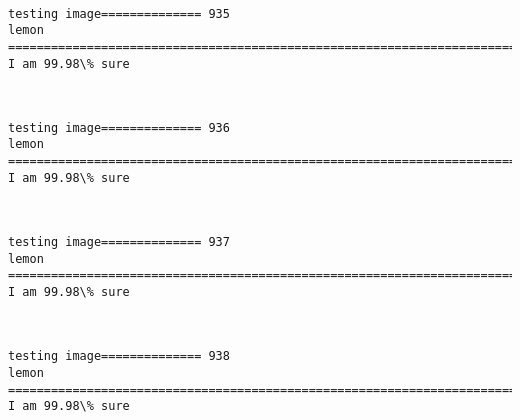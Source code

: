 \documentclass[11pt]{article}
\begin{document}
    \begin{center}
    \end{center}
    { \hspace*{\fill} \\}
    
    \begin{Verbatim}[commandchars=\\\{\}]
testing image============== 935
lemon
============================================================================
I am 99.98\% sure

    \end{Verbatim}

    \begin{center}
    \end{center}
    { \hspace*{\fill} \\}
    
    \begin{Verbatim}[commandchars=\\\{\}]
testing image============== 936
lemon
============================================================================
I am 99.98\% sure

    \end{Verbatim}

    \begin{center}
    \end{center}
    { \hspace*{\fill} \\}
    
    \begin{Verbatim}[commandchars=\\\{\}]
testing image============== 937
lemon
============================================================================
I am 99.98\% sure

    \end{Verbatim}

    \begin{center}
    \end{center}
    { \hspace*{\fill} \\}
    
    \begin{Verbatim}[commandchars=\\\{\}]
testing image============== 938
lemon
============================================================================
I am 99.98\% sure

    \end{Verbatim}
\end{document}
